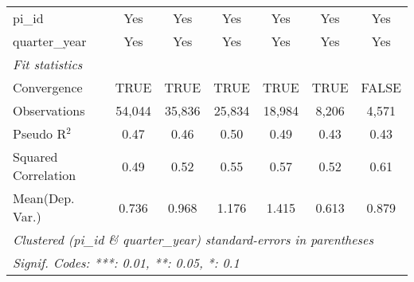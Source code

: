 \begin{tabular}{lcccccc}
   pi\_id                                                     & Yes           & Yes           & Yes           & Yes           & Yes          & Yes\\  
   quarter\_year                                              & Yes           & Yes           & Yes           & Yes           & Yes          & Yes\\  
   \midrule
   \emph{Fit statistics}\\
   Convergence                                                &TRUE           & TRUE          & TRUE          & TRUE          & TRUE         & FALSE\\  
   Observations                                               & 54,044        & 35,836        & 25,834        & 18,984        & 8,206        & 4,571\\  
   Pseudo R$^2$                                               & 0.47          & 0.46          & 0.50          & 0.49          & 0.43         & 0.43\\  
   Squared Correlation                                        & 0.49          & 0.52          & 0.55          & 0.57          & 0.52         & 0.61\\  
Mean(Dep. Var.) & 0.736 & 0.968 & 1.176 & 1.415 & 0.613 & 0.879 \\
   \midrule \midrule
   \multicolumn{7}{l}{\emph{Clustered (pi\_id \& quarter\_year) standard-errors in parentheses}}\\
   \multicolumn{7}{l}{\emph{Signif. Codes: ***: 0.01, **: 0.05, *: 0.1}}\\
\end{tabular}
\par\endgroup
